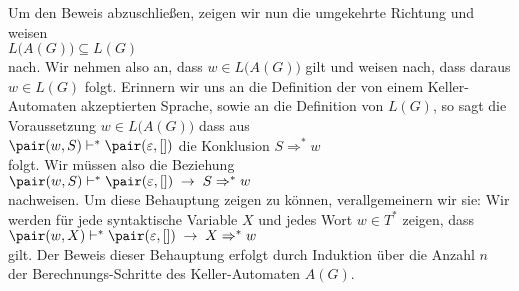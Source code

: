 Um den Beweis abzuschlie{\ss}en, zeigen wir nun die umgekehrte Richtung und weisen 
\\[0.2cm]
\hspace*{1.3cm}
$L\bigl(A(G)\bigr) \subseteq L(G)$
\\[0.2cm]
nach.  Wir nehmen also an, dass $w \in L\bigl(A(G)\bigr)$ gilt und weisen nach, dass
daraus $w \in L(G)$ folgt.
Erinnern wir uns an die Definition der von einem Keller-Automaten akzeptierten
Sprache, sowie an die Definition von $L(G)$, so sagt die Voraussetzung $w \in
L\bigl(A(G)\bigr)$ dass aus
\\[0.2cm]
\hspace*{1.3cm}
$\pair(w,S) \vdash^* \pair(\varepsilon,[])$ \quad die Konklusion \quad $S \Rightarrow^* w$
\\[0.2cm]
folgt.  Wir m\"ussen also die Beziehung
\\[0.2cm]
\hspace*{1.3cm}
$\pair(w,S) \vdash^* \pair(\varepsilon,[]) \;\rightarrow\; S \Rightarrow^* w$
\\[0.2cm]
nachweisen.  Um diese Behauptung zeigen zu k\"onnen, verallgemeinern wir sie:  Wir werden
f\"ur jede syntaktische Variable $X$ und jedes Wort $w \in T^*$ zeigen, dass
\\[0.2cm]
\hspace*{1.3cm}
$\pair(w,X) \vdash^* \pair(\varepsilon,[]) \;\rightarrow\; X \Rightarrow^* w$
\\[0.2cm]
gilt.  Der Beweis dieser Behauptung erfolgt durch Induktion \"uber die Anzahl $n$ der
Berechnungs-Schritte des Keller-Automaten $A(G)$.
